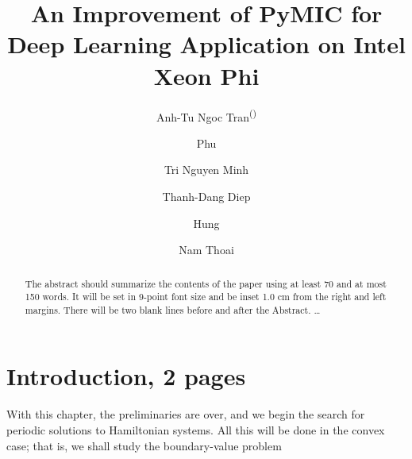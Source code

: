 \documentclass{llncs}
\begin{document}
%
\frontmatter          %
%
\pagestyle{headings}  %
%
\title{An Improvement of PyMIC for Deep Learning Application on Intel Xeon Phi}
%
%
\author{Anh-Tu Ngoc Tran\textsuperscript{(\Letter)} \and
Phu  \and
Tri Nguyen Minh \and
Thanh-Dang Diep  \and
Hung \and
Nam Thoai
}
%
%
%

\maketitle              %

\begin{abstract}
The abstract should summarize the contents of the paper
using at least 70 and at most 150 words. It will be set in 9-point
font size and be inset 1.0 cm from the right and left margins.
There will be two blank lines before and after the Abstract. \dots


\end{abstract}
%
\section{Introduction, 2 pages}
%
With this chapter, the preliminaries are over, and we begin the search
for periodic solutions to Hamiltonian systems. All this will be done in
the convex case; that is, we shall study the boundary-value problem

\end{document}
